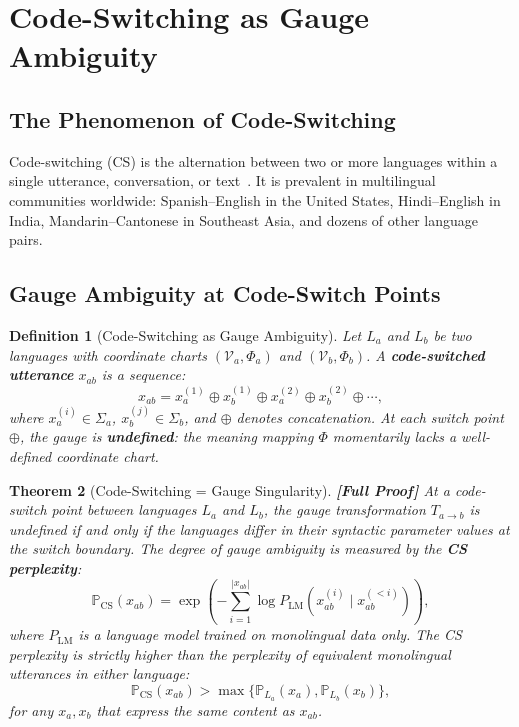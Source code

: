 \documentclass[12pt,a4paper]{article}
\newtheorem{theorem}{Theorem}[section]
\newtheorem{definition}[theorem]{Definition}
\theoremstyle{remark}
\newcommand{\Pbb}{\mathbb{P}}
\newcommand{\Vocab}{\mathcal{V}}
\newcommand{\rigorFull}{\textbf{[Full Proof]}}
\begin{document}
\section{Code-Switching as Gauge Ambiguity}
\label{sec:codewitching}

\subsection{The Phenomenon of Code-Switching}

Code-switching (CS) is the alternation between two or more languages
within a single utterance, conversation, or text~\cite{myers2002code}.
It is prevalent in multilingual communities worldwide: Spanish--English
in the United States, Hindi--English in India, Mandarin--Cantonese in
Southeast Asia, and dozens of other language pairs.

\subsection{Gauge Ambiguity at Code-Switch Points}

\begin{definition}[Code-Switching as Gauge Ambiguity]
\label{def:codewitching_gauge}
Let $L_a$ and $L_b$ be two languages with coordinate charts
$(\Vocab_a, \Phi_a)$ and $(\Vocab_b, \Phi_b)$. A \textbf{code-switched
utterance} $x_{ab}$ is a sequence:
\begin{equation}
  x_{ab} = x_a^{(1)} \oplus x_b^{(1)} \oplus x_a^{(2)} \oplus x_b^{(2)} \oplus \cdots,
\end{equation}
where $x_a^{(i)} \in \Sigma_a$, $x_b^{(j)} \in \Sigma_b$, and
$\oplus$ denotes concatenation. At each switch point $\oplus$,
the gauge is \textbf{undefined}: the meaning mapping $\Phi$
momentarily lacks a well-defined coordinate chart.
\end{definition}

\begin{theorem}[Code-Switching = Gauge Singularity]
\label{thm:codewitching_singularity}
\rigorFull
At a code-switch point between languages $L_a$ and $L_b$, the
gauge transformation $T_{a\to b}$ is undefined if and only if
the languages differ in their syntactic parameter values at
the switch boundary. The degree of gauge ambiguity is measured
by the \textbf{CS perplexity}:
\begin{equation}
  \label{eq:cs_perplexity}
  \Pbb_{\text{CS}}(x_{ab}) = \exp\left(-\sum_{i=1}^{|x_{ab}|}
    \log P_{\text{LM}}(x_{ab}^{(i)} \mid x_{ab}^{(<i)})\right),
\end{equation}
where $P_{\text{LM}}$ is a language model trained on monolingual
data only. The CS perplexity is strictly higher than the perplexity
of equivalent monolingual utterances in either language:
\begin{equation}
  \Pbb_{\text{CS}}(x_{ab}) > \max\{\Pbb_{L_a}(x_a), \Pbb_{L_b}(x_b)\},
\end{equation}
for any $x_a, x_b$ that express the same content as $x_{ab}$.
\end{theorem}
\end{document}
